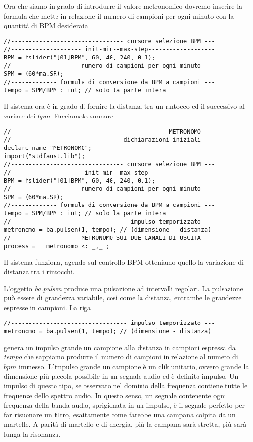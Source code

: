 Ora che siamo in grado di introdurre il valore metronomico dovremo inserire
la formula che mette in relazione il numero di campioni per ogni minuto con la
quantità di BPM desiderata

\begin{lstlisting}
//-------------------------------- cursore selezione BPM ---
//-------------------- init-min--max-step-------------------
BPM = hslider("[01]BPM", 60, 40, 240, 0.1);
//------------------- numero di campioni per ogni minuto ---
SPM = (60*ma.SR);
//------------- formula di conversione da BPM a campioni ---
tempo = SPM/BPM : int; // solo la parte intera
\end{lstlisting}

Il sistema ora è in grado di fornire la distanza tra un rintocco ed il successivo
al variare dei $bpm$. Facciamolo suonare.

\begin{lstlisting}
//-------------------------------------------- METRONOMO ---
//------------------------------- dichiarazioni iniziali ---
declare name "METRONOMO";
import("stdfaust.lib");
//-------------------------------- cursore selezione BPM ---
//-------------------- init-min--max-step-------------------
BPM = hslider("[01]BPM", 60, 40, 240, 0.1);
//------------------- numero di campioni per ogni minuto ---
SPM = (60*ma.SR);
//------------- formula di conversione da BPM a campioni ---
tempo = SPM/BPM : int; // solo la parte intera
//--------------------------------- impulso temporizzato ---
metronomo = ba.pulsen(1, tempo); // (dimensione - distanza)
//------------------- METRONOMO SUI DUE CANALI DI USCITA ---
process =   metronomo <: _,_ ;
\end{lstlisting}

Il sistema funziona, agendo sul controllo BPM otteniamo quello la variazione di
distanza tra i rintocchi.

L'oggetto \emph{ba.pulsen} produce una pulsazione ad intervalli regolari.
La pulsazione può essere di grandezza variabile, così come la distanza, entrambe
le grandezze espresse in campioni. La riga

\begin{lstlisting}
//--------------------------------- impulso temporizzato ---
metronomo = ba.pulsen(1, tempo); // (dimensione - distanza)
\end{lstlisting}

genera un impulso grande un campione alla distanza in campioni espressa da \emph{tempo}
che sappiamo produrre il numero di campioni in relazione al numero di $bpm$ immesso.
L'impulso grande un campione è un clik unitario, ovvero grande la dimensione
più piccola possibile in un segnale audio ed è definito impulso.
Un impulso di questo tipo, se osservato nel dominio della frequenza contiene tutte
le frequenze dello spettro audio. In questo senso, un segnale contenente ogni
frequenza della banda audio, sprigionata in un impulso, è il segnale perfetto per
far risuonare un filtro, esattamente come farebbe una campana colpita da un martello.
A parità di martello e di energia, più la campana sarà stretta, più sarà lunga la risonanza.

